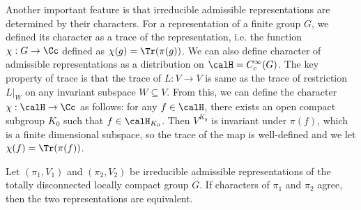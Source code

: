Another important feature is that irreducible admissible representations are determined by their characters. 
For a representation of a finite group $G$, we defined its character as a trace of the representation, i.e. the function $\chi:G\to \Cc$ defined as $\chi(g) = \Tr(\pi(g))$. 
We can also define character of admissible representations as a distribution on $\calH = C^{\infty}_{c}(G)$. The key property of trace is that the trace of $L:V\to V$ is same as the trace of restriction $L|_{W}$ on any invariant subspace $W\subseteq V$. From this, we can define the character $\chi:\calH\to \Cc$ as follows: for any $f\in \calH$, there exists an open compact subgroup $K_{0}$ such that $f\in\calH_{K_{0}}$.  
Then $V^{K_{0}}$ is invariant under $\pi(f)$, which is a finite dimensional subspace, so the trace of the map is well-defined and we let $\chi(f) = \Tr(\pi(f))$. 
\begin{theorem}
\label{char}
Let $(\pi_{1}, V_{1})$ and $(\pi_{2}, V_{2})$ be irreducible admissible representations of the totally disconnected locally compact group $G$. If characters of $\pi_{1}$ and $\pi_{2}$ agree, then the two representations are equivalent. 
\end{theorem}
